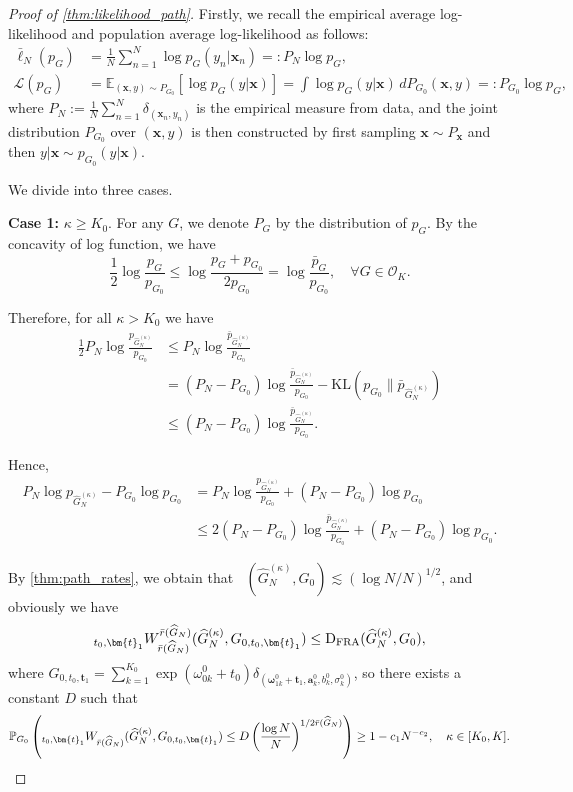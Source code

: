 \documentclass[twoside]{article}
\DeclareMathOperator*{\VDFRA}{D_{FRA}}
\let\inf\relax
\DeclareMathOperator*\inf{\vphantom{p}inf}
\theoremstyle{plain}
\theoremstyle{definition}
\theoremstyle{plain}
\def\rvx{{\mathbf{x}}}
\def\vomega{{\bm{\omega}}}
\def\va{{\bm{a}}}
\def\vt{{\bm{t}}}
\def\vx{{\bm{x}}}
\newcommand{\cL}{\mathcal{L}}
\begin{document}
\begin{proof}[Proof of \cref{thm:likelihood_path}]
Firstly, we recall the empirical average log-likelihood and population average log-likelihood as follows:
\begin{align}
    \bar\ell_N(p_G) &= \frac{1}{N} \sum_{n=1}^N \log p_G(y_n | \rvx_n) =: P_N \log p_G, \nonumber\\
    \cL(p_G) &= \mathbb{E}_{(\rvx,y) \sim P_{G_0}} \left[ \log p_G(y | \vx) \right] = \int \log p_G(y | \vx) \, dP_{G_0}(\vx, y) =: P_{G_0} \log p_G, \nonumber
\end{align}
where $P_N := \frac{1}{N} \sum_{n=1}^N \delta_{(\rvx_n, y_n)}$ is the empirical measure from data, and the joint distribution $P_{G_0}$ over $(\vx, y)$ is then constructed by first sampling $\vx \sim P_{\rvx}$ and then $y | \vx \sim p_{G_0}(y | \vx)$.

    We divide into three cases.
    
    \textbf{Case 1:} $\kappa \geq K_0$. For any $G$, we denote $P_G$ by the distribution of $p_G$. By the concavity of log function, we have $$\frac{1}{2} \log{\frac{p_G}{p_{G_0}}} \leq \log{\frac{p_G + p_{G_0}}{2p_{G_0}}} = \log{\frac{\bar{p}_G}{p_{G_0}}}, \quad \forall G\in \mathcal{O}_K.$$

    Therefore, for all $\kappa > K_0$ we have 
    \begin{align*}
        \frac{1}{2} P_N \log{\frac{p_{\widehat G^{(\kappa)}_N}}{p_{G_0}}} &\leq P_N \log{\frac{\bar{p}_{\widehat G^{(\kappa)}_N}}{p_{G_0}}} \\
        &= (P_N - P_{G_0}) \log{\frac{\bar{p}_{\widehat G^{(\kappa)}_N}}{p_{G_0}}} - \mathrm{KL} (p_{G_0} \| \bar{p}_{\widehat G^{(\kappa)}_N}) \\
        &\leq (P_N - P_{G_0}) \log{\frac{\bar{p}_{\widehat G^{(\kappa)}_N}}{p_{G_0}}}.
    \end{align*}

    Hence,
    \begin{align}
        P_N \log{p_{\widehat G^{(\kappa)}_N}} - P_{G_0} \log p_{G_0} &= P_N \log{\frac{p_{\widehat G^{(\kappa)}_N}}{p_{G_0}}} + (P_N - P_{G_0}) \log{p_{G_0}} \nonumber\\
        &\leq 2(P_N - P_{G_0}) \log{\frac{\bar{p}_{\widehat G^{(\kappa)}_N}}{p_{G_0}}} + (P_N - P_{G_0}) \log{p_{G_0}}. \nonumber
    \end{align}

    By \cref{thm:path_rates}, we obtain that $\VDFRA (\widehat{G}_N^{(\kappa)}, G_0) \lesssim (\log{N}/N)^{1/2}$, and obviously we have $$\inf_{t_0, \vt_1} W_{\bar{r}(\widehat{G}_N)}^{\bar{r}(\widehat{G}_N)} (\widehat{G}_N^{(\kappa)}, G_{0, t_0, \vt_1}) \leq \VDFRA (\widehat{G}_N^{(\kappa)}, G_0),$$ where $G_{0, t_0, \vt_1} = \sum_{k = 1}^{K_0} \exp{(\omega_{0k}^0 + t_0) \delta_{(\vomega_{1k}^0 + \vt_1, \va_k^0, b_k^0, \sigma_k^0)}}$, so there exists a constant $D$ such that $$\mathbb{P}_{G_0} \left( \inf_{t_0, \vt_1} W_{\bar{r}(\widehat{G}_N)} (\widehat{G}_N^{(\kappa)}, G_{0, t_0, \vt_1}) \leq D \left( \frac{\log N}{N} \right)^{1/2\bar{r}(\widehat{G}_N)} \right) \geq 1 - c_1 N^{-c_2}, \quad \kappa \in [K_0, K].$$


\end{proof}
\end{document}
